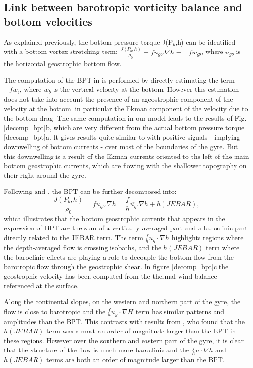 \documentclass{ametsoc}
\begin{document}
\subsection{Link between barotropic vorticity balance and bottom velocities}


As explained previously, the bottom pressure torque J(P$_b$,h) can be identified with a bottom vortex stretching term: $\frac{J(P_b,h)}{\rho _0}=f u_{gb}.\nabla h = -f w_{gb}$, where $u_{gb}$ is the horizontal geostrophic bottom flow. 

The computation of the BPT in \citet{spence2012} is performed by directly estimating the term  $-f w_{b}$, where $w_{b}$ is the vertical velocity at the bottom. However this estimation does not take into account the presence of an ageostrophic component of the velocity at the bottom, in particular the Ekman component of the velocity due to the bottom drag. The same computation in our model leads to the results of Fig. \ref{decomp_bpt}b, which are very different from the actual bottom pressure torque \ref{decomp_bpt}a. It gives results quite similar to \citet{spence2012} with positive signals - implying downwelling of bottom currents - over most of the boundaries of the gyre. But this downwelling is a result of the Ekman currents oriented to the left of the main bottom geostrophic currents, which are flowing with the shallower topography on their right around the gyre.

Following \citet{mertz1992} and \citet{yeager2015}, the BPT can be further decomposed into:
%
$$\frac{J(P_b,h)}{\rho _0}=f u_{gb}.\nabla h = \frac{f}{h} \overline{u_g}.\nabla h +  h(JEBAR),$$
which illustrates that the bottom geostrophic currents that appears in the expression of BPT are the sum of a vertically averaged part and a baroclinic part directly related to the JEBAR term. The term $ \frac{f}{h} \overline{u_g} \cdot \nabla h$ highlights regions where the depth-averaged flow is crossing isobaths, and the $h(JEBAR)$ term where the baroclinic effects are playing a role to decouple the bottom flow from the barotropic flow through the geostrophic shear. In figure \ref{decomp_bpt}c the geostrophic velocity has been computed from the thermal wind balance referenced at the surface.

Along the continental slopes, on the western and northern part of the gyre, the flow is close to barotropic and the $ \frac{f}{h} \overline{u_g} \cdot \nabla H$ term has similar patterns and amplitudes than the BPT. This contrasts with results from \citet{yeager2015}, who found that the $h(JEBAR)$ term was almost an order of magnitude larger than the BPT in these regions. However over the southern and eastern part of the gyre, it is clear that the structure of the flow is much more baroclinic and the $ \frac{f}{h} \overline{u} \cdot \nabla h$ and  $h(JEBAR)$ terms are both an order of magnitude larger than the BPT.
\end{document}

